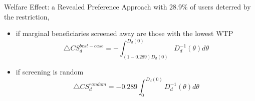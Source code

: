 \begin{frame}{Welfare Effect: a Revealed Preference Approach}
    with 28.9\% of users deterred by the restriction, 
    \begin{itemize}
        \item if marginal beneficiaries screened away are those with the lowest WTP 
        $$\triangle CS_d^{best-case} = -\int_{(1-0.289)D_d(0)}^{D_d(0)} D_d^{-1}(\theta) d\theta $$

        \item if screening is random
        $$\triangle CS_d^{random} = -0.289\int_0^{D_d(0)} D_d^{-1}(\theta) d\theta $$
        
    \end{itemize}
    
\end{frame}


